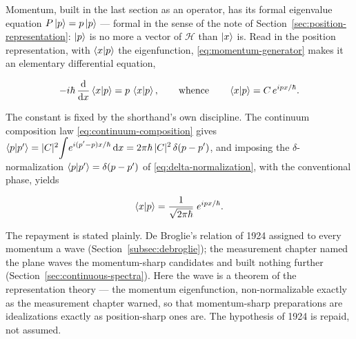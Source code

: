 Momentum, built in the last section as an operator, has its formal eigenvalue equation $P\ket{p} = p\ket{p}$ --- formal in the sense of the note of Section~\ref{sec:position-representation}: $\ket{p}$ is no more a vector of $\mathcal{H}$ than $\ket{x}$ is. Read in the position representation, with $\braket{x|p}$ the eigenfunction, \eqref{eq:momentum-generator} makes it an elementary differential equation,
\begin{linenomath}
    \begin{equation*}
        -i\hbar\,\frac{\mathrm{d}}{\mathrm{d} x}\braket{x|p} = p\,\braket{x|p},
        \qquad\text{whence}\qquad
        \braket{x|p} = C\,e^{ipx/\hbar} .
    \end{equation*}
\end{linenomath}
The constant is fixed by the shorthand's own discipline. The continuum composition law \eqref{eq:continuum-composition} gives $\braket{p|p'} = |C|^2\!\displaystyle\int\!e^{i(p'-p)x/\hbar}\,\mathrm{d} x = 2\pi\hbar\,|C|^2\,\delta(p - p')$, and imposing the $\delta$-normalization $\braket{p|p'} = \delta(p - p')$ of \eqref{eq:delta-normalization}, with the conventional phase, yields
\begin{linenomath}
    \begin{equation}
        \braket{x|p} = \frac{1}{\sqrt{2\pi\hbar}}\;e^{ipx/\hbar} .
        \label{eq:debroglie-wave}
    \end{equation}
\end{linenomath}
The repayment is stated plainly. De Broglie's relation of 1924 assigned to every momentum a wave (Section~\ref{subsec:debroglie}); the measurement chapter named the plane waves the momentum-sharp candidates and built nothing further (Section~\ref{sec:continuous-spectra}). Here the wave is a theorem of the representation theory --- the momentum eigenfunction, non-normalizable exactly as the measurement chapter warned, so that momentum-sharp preparations are idealizations exactly as position-sharp ones are. The hypothesis of 1924 is repaid, not assumed.

